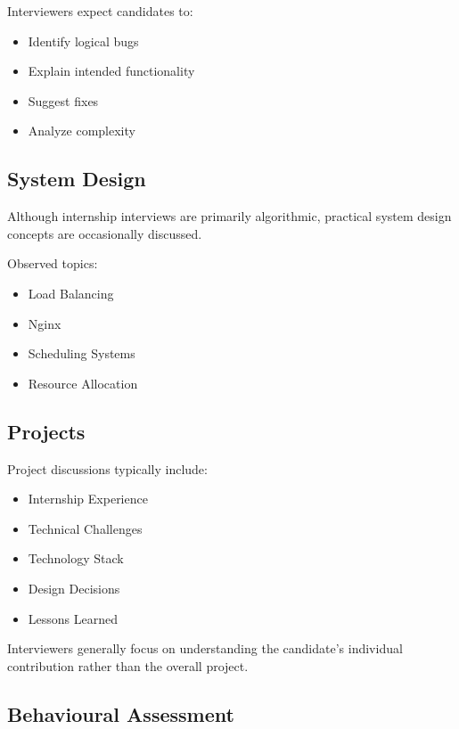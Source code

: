 \documentclass[11pt,a4paper]{article}
\begin{document}
Interviewers expect candidates to:

\begin{itemize}
	\item Identify logical bugs
	\item Explain intended functionality
	\item Suggest fixes
	\item Analyze complexity
\end{itemize}


\subsection{System Design}

Although internship interviews are primarily algorithmic, practical system design concepts are occasionally discussed.

Observed topics:

\begin{itemize}
	\item Load Balancing
	\item Nginx
	\item Scheduling Systems
	\item Resource Allocation
\end{itemize}


\subsection{Projects}

Project discussions typically include:

\begin{itemize}
	\item Internship Experience
	\item Technical Challenges
	\item Technology Stack
	\item Design Decisions
	\item Lessons Learned
\end{itemize}

Interviewers generally focus on understanding the candidate's individual contribution rather than the overall project.


\subsection{Behavioural Assessment}
\end{document}
